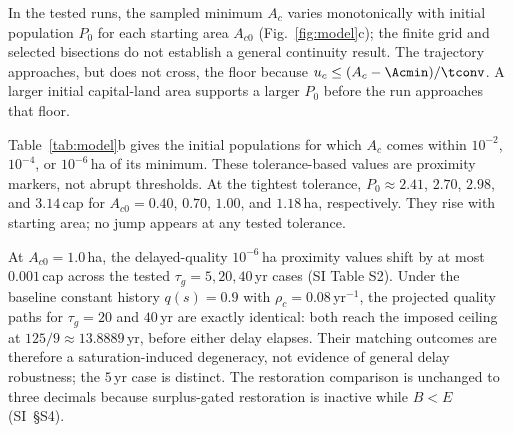 In the tested runs, the sampled minimum $A_c$ varies monotonically with initial population $P_0$ for each starting area $A_{c0}$ (Fig.~\ref{fig:model}c); the finite grid and selected bisections do not establish a general continuity result. The trajectory approaches, but does not cross, the floor because $u_c\le(A_c-\Acmin)/\tconv$. A larger initial capital-land area supports a larger $P_0$ before the run approaches that floor.

Table~\ref{tab:model}b gives the initial populations for which $A_c$ comes within $10^{-2}$, $10^{-4}$, or $10^{-6}$\,ha of its minimum. These tolerance-based values are proximity markers, not abrupt thresholds. At the tightest tolerance, $P_0\approx2.41$, $2.70$, $2.98$, and $3.14$\,cap for $A_{c0}=0.40$, $0.70$, $1.00$, and $1.18$\,ha, respectively. They rise with starting area; no jump appears at any tested tolerance.

At $A_{c0}=1.0$\,ha, the delayed-quality $10^{-6}$\,ha proximity values shift by at most $0.001$\,cap across the tested $\tau_g=5,20,40$\,yr cases (SI Table S2). Under the baseline constant history $q(s)=0.9$ with $\rho_c=0.08$\,yr$^{-1}$, the projected quality paths for $\tau_g=20$ and $40$\,yr are exactly identical: both reach the imposed ceiling at $125/9\approx13.8889$\,yr, before either delay elapses. Their matching outcomes are therefore a saturation-induced degeneracy, not evidence of general delay robustness; the $5$\,yr case is distinct. The restoration comparison is unchanged to three decimals because surplus-gated restoration is inactive while $B<E$ (SI~\S S4).

